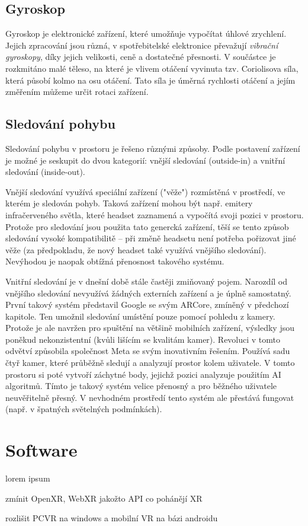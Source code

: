 \section{Gyroskop}

Gyroskop je elektronické zařízení, které umožňuje vypočítat úhlové zrychlení. Jejich zpracování jsou různá, v spotřebitelské elektronice převažují \textit{vibrační gyroskopy}, díky jejich velikosti, ceně a dostatečné přesnosti. V součástce je rozkmitáno malé těleso, na které je vlivem otáčení vyvinuta tzv. Coriolisova síla, která působí kolmo na osu otáčení. Tato síla je úměrná rychlosti otáčení a jejím změřením můžeme určit rotaci zařízení. \cite{Electricity_Magnetism} \cite{techmania_coriolis}

\section{Sledování pohybu}

Sledování pohybu v prostoru je řešeno různými způsoby. Podle postavení zařízení je možné je seskupit do dvou kategorií: vnější sledování (outside-in) a vnitřní sledování (inside-out).

Vnější sledování využívá speciální zařízení ("věže") rozmístěná v prostředí, ve kterém je sledován pohyb. Taková zařízení mohou být např. emitery infračerveného světla, které headset zaznamená a vypočítá svoji pozici v prostoru. Protože pro sledování jsou použita tato genercká zařízení, těší se tento způsob sledování vysoké kompatibilitě -- při změně headsetu není potřeba pořizovat jiné věže (za předpokladu, že nový headset také využívá vnějšího sledování). Nevýhodou je naopak obtížná přenosnost takového systému. \cite{vr_tracking_suvi}

Vnitřní sledování je v dnešní době stále častěji zmiňovaný pojem. Narozdíl od vnějšího sledování nevyužívá žádných externích zařízení a je úplně samostatný. První takový systém představil Google se svým ARCore, zmíněný v předchozí kapitole. Ten umožnil sledování umístění pouze pomocí pohledu z kamery. \cite{enwiki:1182789097} Protože je ale navržen pro spuštění na většině mobilních zařízení, výsledky jsou poněkud nekonzistentní (kvůli lišícím se kvalitám kamer).
Revoluci v tomto odvětví způsobila společnost Meta se svým inovativním řešením. Používá sadu čtyř kamer, které průběžně sledují a analyzují prostor kolem uživatele. V tomto prostoru si poté vytvoří záchytné body, jejichž pozici analyzuje použitím AI algoritmů. Tímto je takový systém velice přenosný a pro běžného uživatele neuvěřitelně přesný. V nevhodném prostředí tento systém ale přestává fungovat (např. v špatných světelných podmínkách).

\chapter{Software}
lorem ipsum

zmínit OpenXR, WebXR jakožto API co pohánějí XR

rozlišit PCVR na windows a mobilní VR na bázi androidu